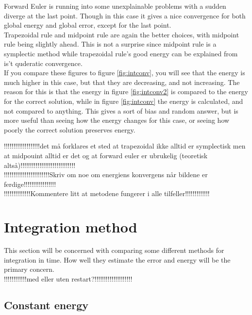 Forward Euler is running into some unexplainable problems with a sudden diverge at the last point. Though in this case it gives a nice convergence for both global energy and global error, except for the last point. \\

Trapezoidal rule and midpoint rule are again the better choices, with midpoint rule being slightly ahead. This is not a surprise since midpoint rule is a symplectic method while trapezoidal rule's good energy can be explained from is't quderatic convergence. \\

If you compare these figures to figure \ref{fig:intconv}, you will see that the energy is much higher in this case, but that they are decreasing, and not increasing. The reason for this is that the energy in figure \ref{fig:intconv2} is compared to the energy for the correct solution, while in figure \ref{fig:intconv} the energy is calculated, and not compared to anything. This gives a sort of bias and random answer, but is more useful than seeing how the energy changes for this case, or seeing how poorly the correct solution preserves energy.

!!!!!!!!!!!!!!!!!!!det må forklares et sted at trapezoidal ikke alltid er symplectisk men at midpouint alltid er det og at forward euler er ubrukelig (teoretisk altså)!!!!!!!!!!!!!!!!!!!!!!!!!!!!!\\

!!!!!!!!!!!!!!!!!!!!!!!!Skriv om noe om energiens konvergens når bildene er ferdige!!!!!!!!!!!!!!!!!\\

!!!!!!!!!!!!!!Kommentere litt at metodene fungerer i alle tilfeller!!!!!!!!!!!!!\\
\section{Integration method} %
This section will be concerned with comparing some different methods for integration in time. How well they estimate the error and energy will be the primary concern. \\
!!!!!!!!!!!!med eller uten restart?!!!!!!!!!!!!!!!!!!!!\\
\subsection{Constant energy}%


